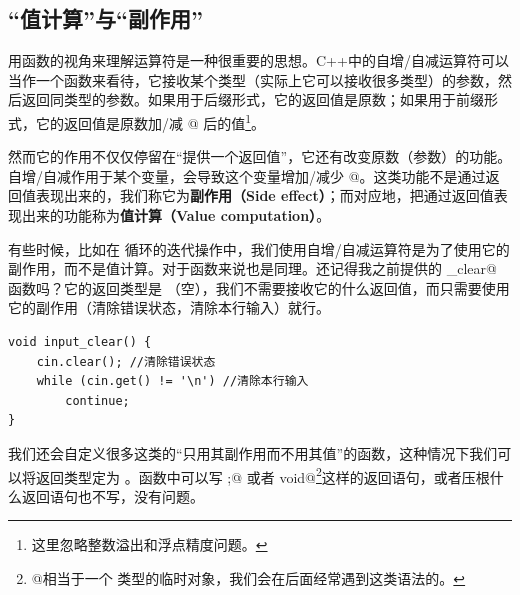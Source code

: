 \subsection*{``值计算''与``副作用''}
用函数的视角来理解运算符是一种很重要的思想。C++中的自增/自减运算符可以当作一个函数来看待，它接收某个类型（实际上它可以接收很多类型）的参数，然后返回同类型的参数。如果用于后缀形式，它的返回值是原数；如果用于前缀形式，它的返回值是原数加/减 @ 后的值\footnote{这里忽略整数溢出和浮点精度问题。}。\par
然而它的作用不仅仅停留在``提供一个返回值''，它还有改变原数（参数）的功能。自增/自减作用于某个变量，会导致这个变量增加/减少 @。这类功能不是通过返回值表现出来的，我们称它为\textbf{副作用（Side effect）}；而对应地，把通过返回值表现出来的功能称为\textbf{值计算（Value computation）}。\par
有些时候，比如在 \lstinline@for@ 循环的迭代操作中，我们使用自增/自减运算符是为了使用它的副作用，而不是值计算。对于函数来说也是同理。还记得我之前提供的 \lstinline@input_clear@ 函数吗？它的返回类型是 \lstinline@void@（空），我们不需要接收它的什么返回值，而只需要使用它的副作用（清除错误状态，清除本行输入）就行。
\begin{lstlisting}
void input_clear() {
    cin.clear(); //清除错误状态
    while (cin.get() != '\n') //清除本行输入
        continue;
}
\end{lstlisting}
我们还会自定义很多这类的``只用其副作用而不用其值''的函数，这种情况下我们可以将返回类型定为 \lstinline@void@。\lstinline@void@ 函数中可以写 \lstinline@return ;@ 或者 \lstinline@return void{}@\footnote{\lstinline@void{}@相当于一个 \lstinline@void@ 类型的临时对象，我们会在后面经常遇到这类语法的。}这样的返回语句，或者压根什么返回语句也不写，没有问题。\par
